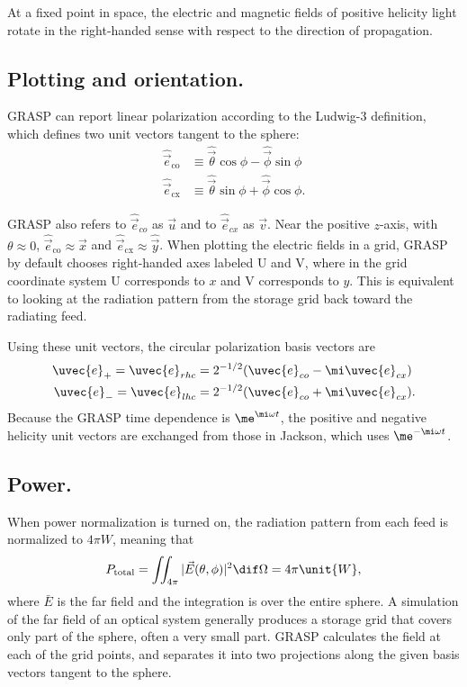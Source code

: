 \documentclass[10pt,english]{article}
\begin{document}
At a fixed point in space, the electric and magnetic fields of positive helicity light rotate in the right-handed sense with respect to the direction of propagation.

\subsection*{Plotting and orientation.}

GRASP can report linear polarization according to the Ludwig-3 definition, which defines two unit vectors tangent to the sphere:
\begin{align*}
\hat{\vec{e}}_{\text{co}} &\equiv \hat{\vec{\theta}} \cos \phi - \hat{\vec{\phi}} \sin \phi \\
\hat{\vec{e}}_{\text{cx}} & \equiv \hat{\vec{\theta}} \sin \phi + \hat{\vec{\phi}} \cos \phi.
\end{align*}

GRASP also refers to $\hat{\vec{e}}_{co}$ as $\vec{u}$ and to $\hat{\vec{e}}_{cx}$ as $\vec{v}$. Near the positive $z$-axis, with $\theta \approx 0$, $\hat{\vec{e}}_{\text{co}} \approx \hat{\vec{x}}$ and $\hat{\vec{e}}_{\text{cx}} \approx \hat{\vec{y}}$. When plotting the electric fields in a grid, GRASP by default chooses right-handed axes labeled U and V, where in the grid coordinate system U corresponds to $x$ and V corresponds to $y$. This is equivalent to looking at the radiation pattern from the storage grid back toward the radiating feed.

Using these unit vectors, the circular polarization basis vectors are
\begin{align*}
\uvec{e}_{+} = \uvec{e}_{rhc} &= 2^{-1/2} (\uvec{e}_{co} - \mi \uvec{e}_{cx}) \\
\uvec{e}_{-} = \uvec{e}_{lhc} &= 2^{-1/2} (\uvec{e}_{co} + \mi \uvec{e}_{cx}).
\end{align*}
Because the GRASP time dependence is $\me^{\mi \omega t}$, the positive and negative helicity unit vectors are exchanged from those in Jackson, which uses $\me^{- \mi \omega t}$.

\subsection*{Power.}

When power normalization is turned on, the radiation pattern from each feed is normalized to $4 \pi \unit{W}$, meaning that
\begin{equation*}
P_{\text{total}} = \iint_{4 \pi} | \vec{E}(\theta, \phi) |^{2} \dif \Omega = 4 \pi \unit{W},
\end{equation*}
where $\bar{E}$ is the far field and the integration is over the entire sphere. A simulation of the far field of an optical system generally produces a storage grid that covers only part of the sphere, often a very small part. GRASP calculates the field at each of the grid points, and separates it into two projections along the given basis vectors tangent to the sphere.
\end{document}
